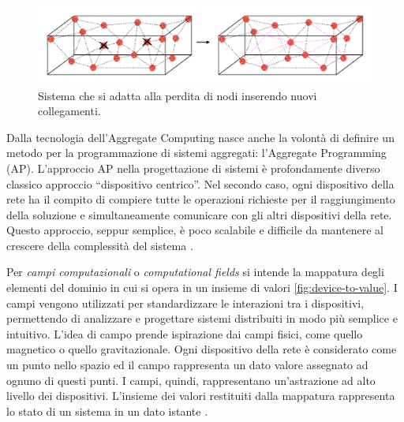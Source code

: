 \documentclass[12pt,a4paper,openright,twoside]{book}
\begin{document}
\begin{figure}
    \centering
    \includegraphics[width=.9\linewidth]{figures/lost-nodes.pdf}
    \caption{Sistema che si adatta alla perdita di nodi inserendo nuovi collegamenti.}
    \label{fig:lost-nodes}
\end{figure}

Dalla tecnologia dell'Aggregate Computing nasce anche la volontà di definire un metodo per la programmazione di sistemi aggregati: l'Aggregate Programming (AP). 
L'approccio \ac{AP} nella progettazione di sistemi è profondamente diverso classico approccio ``dispositivo centrico''.
Nel secondo caso, ogni dispositivo della rete ha il compito di compiere tutte le operazioni richieste per il raggiungimento della soluzione e simultaneamente comunicare con gli altri dispositivi della rete. Questo approccio, seppur semplice, è poco scalabile e difficile da mantenere al crescere della complessità del sistema \cite{Pianini2017}. 


Per \textit{campi computazionali} o \textit{computational fields} si intende la mappatura degli elementi del dominio in cui si opera in un insieme di valori \cref{fig:device-to-value}.
I campi vengono utilizzati per standardizzare le interazioni tra i dispositivi, permettendo di analizzare e progettare sistemi distribuiti in modo più semplice e intuitivo. L'idea di campo prende ispirazione dai campi fisici, come quello magnetico o quello gravitazionale. Ogni dispositivo della rete è considerato come un punto nello spazio ed il campo rappresenta un dato valore assegnato ad ognuno di questi punti. I campi, quindi, rappresentano un'astrazione ad alto livello dei dispositivi. L'insieme dei valori restituiti dalla mappatura rappresenta lo stato di un sistema in un dato istante \cite{Audrito2019}.
\end{document}
